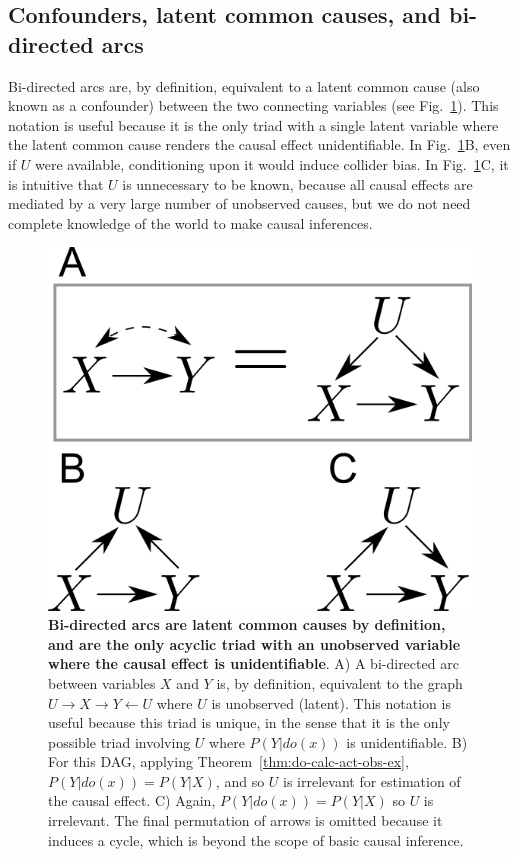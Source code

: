 \documentclass[11pt]{article}
\numberwithin{equation}{section}
\begin{document}
\subsection{Confounders, latent common causes, and bi-directed arcs}

Bi-directed arcs are, by definition, equivalent to a latent common cause (also known as a confounder) between the two connecting variables (see Fig.~\ref{Fig:confounders}). This notation is useful because it is the only triad with a single latent variable where the latent common cause renders the causal effect unidentifiable. In Fig.~\ref{Fig:confounders}B, even if $U$ were available, conditioning upon it would induce collider bias. In Fig.~\ref{Fig:confounders}C, it is intuitive that $U$ is unnecessary to be known, because all causal effects are mediated by a very large number of unobserved causes, but we do not need complete knowledge of the world to make causal inferences.


\begin{figure}
\begin{center}
\includegraphics[width=0.4\columnwidth]{figures/confounders.png}  
\end{center}
\caption{\textbf{Bi-directed arcs are latent common causes by definition, and are the only acyclic triad with an unobserved variable where the causal effect is unidentifiable}. A) A bi-directed arc between variables $X$ and $Y$ is, by definition, equivalent to the graph $U \rightarrow X \rightarrow Y \leftarrow U$ where $U$ is unobserved (latent). This notation is useful because this triad is unique, in the sense that it is the only possible triad involving $U$ where $P(Y|do(x))$ is unidentifiable. B) For this DAG, applying Theorem~\ref{thm:do-calc-act-obs-ex}, $P(Y|do(x)) = P(Y|X)$, and so $U$ is irrelevant for estimation of the causal effect.  C) Again, $P(Y|do(x)) = P(Y|X)$ so $U$ is irrelevant. The final permutation of arrows is omitted because it induces a cycle, which is beyond the scope of basic causal inference.} 
\label{Fig:confounders}
\end{figure}
\end{document}
